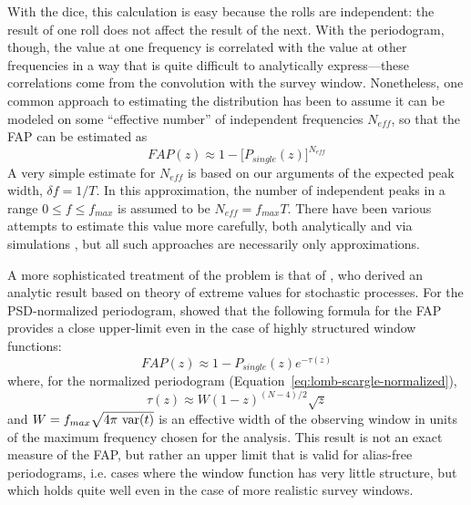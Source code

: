 \documentclass[preprint]{aastex}
\newcommand{\Eq}[1]{Equation~\ref{eq:#1}}
\newcommand{\eq}[1]{\Eq{#1}}
\newcommand{\eqlabel}[1]{\label{eq:#1}}
\begin{document}
With the dice, this calculation is easy because the rolls are independent: the
result of one roll does not affect the result of the next.
With the periodogram, though, the value at one frequency is correlated with
the value at other frequencies in a way that is quite difficult to analytically
express---these correlations come from the convolution with the survey
window.
Nonetheless, one common approach to estimating the distribution has been to
assume it can be modeled on some ``effective number'' of independent
frequencies $N_{eff}$, so that the FAP can be estimated as
\begin{equation}
  FAP(z) \approx 1 - \big[P_{single}(z)\big]^{N_{eff}}
  \eqlabel{FAP-neff}
\end{equation}
A very simple estimate for $N_{eff}$ is based on our arguments of the
expected peak width, $\delta f = 1/T$.
In this approximation, the number of independent peaks in a range
$0 \le f \le f_{max}$ is assumed to be $N_{eff} = f_{max} T$.
There have been various attempts to estimate this value more carefully,
both analytically and via simulations
\citep[see, e.g.][]{Horne86,Schwarzenberg-Czerny98,Cumming04,Frescura08},
but all such approaches are necessarily only approximations.


A more sophisticated treatment of the problem is that of \citet{Baluev2008},
who derived an analytic result based on theory of extreme values
for stochastic processes.
For the PSD-normalized periodogram, \citet{Baluev2008} showed that the following
formula for the FAP provides a close upper-limit even in the case of
highly structured window functions:
\begin{equation}
  FAP(z) \approx 1 - P_{single}(z)e^{-\tau(z)}
  \eqlabel{FAP-baluev}
\end{equation}
where, for the normalized periodogram (\eq{lomb-scargle-normalized}),
\begin{equation}
  \tau(z) \approx W (1 - z)^{(N - 4)/2}\sqrt{z}
\end{equation}
and $W = f_{max} \sqrt{4\pi\ {\rm var}(t)}$ is an effective width of the
observing window in units of the maximum frequency chosen for the analysis.
This result is not an exact measure of the FAP, but rather an
upper limit that is valid for alias-free periodograms, {i.e.} cases
where the window function has very little structure,
but which holds quite well even in the case of more realistic survey windows.
\end{document}
